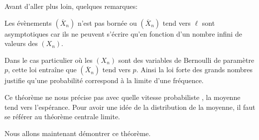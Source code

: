 Avant d'aller plus loin, quelques remarques:
\begin{listremarques}
\item
Les évènements  $\left (\overline{X}_n\right )$ n'est pas bornée ou $\left (\overline{X}_n\right )$ tend vers $\ell$ sont asymptotiques car ils ne peuvent s'écrire qu'en fonction d'un nombre infini de valeurs des $(X_n)$.
\item
Dans le cas particulier où les $(X_n)$ sont des variables de Bernoulli de paramètre $p$, cette loi entraîne que $\left ( \overline{X}_n \right )$ tend vers $p$. Ainsi la loi forte des grands nombres justifie qu'une probabilité correspond à la limite d'une fréquence.
\item
Ce théorème ne nous précise pas avec quelle vitesse \og probabiliste \fg{}, la moyenne tend vers l'espérance. Pour avoir une idée de la distribution de la moyenne, il faut se référer au théorème centrale limite.
\end{listremarques}

Nous allons maintenant démontrer ce théorème.

